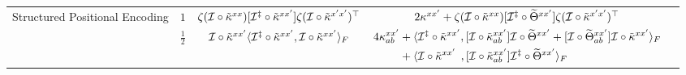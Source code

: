 \documentclass{article}
\begin{document}
\begin{table}[t]
\begin{center}
\begin{sc}
\begin{tabular}{lcccc}
    \midrule
    
    \multirow{2}{*}{
    \begin{minipage}[t]{0.2\columnwidth}%
    Structured Positional Encoding
    \end{minipage}
    } 
    &
    $1$
    &
    $
    \zeta (
        \mathcal{I} \circ
        \tilde{\kappa}^{xx}
    )
    [
        \mathcal{I}^\ddag \circ
        \tilde{\kappa}^{xx'}
    ]
    \zeta (
        \mathcal{I} \circ
        \tilde{\kappa}^{x'x'}
    )^\top
    $
    &
    $
    2 
    \kappa^{xx'}
    +
    \zeta (
        \mathcal{I} \circ
        \tilde{\kappa}^{xx}
    )
    [
        \mathcal{I}^\ddag \circ
        \widetilde{\Theta}^{xx'}
    ]
    \zeta (
        \mathcal{I} \circ
        \tilde{\kappa}^{x'x'}
    )^\top
    $
    \\
    
    &
    $\frac{1}{2}$
    &
    $
    \mathcal{I} \circ
    \tilde{\kappa}^{xx'}
    \langle
        \mathcal{I}^\ddag \circ
        \tilde{\kappa}^{xx'}
        ,
        \mathcal{I} \circ \tilde{\kappa}^{xx'}
    \rangle_F
    $
    &
    $
    \begin{aligned}
    4 \kappa_{ab}^{xx'}
    &+
    \langle
        \mathcal{I}^\ddag \circ
        \tilde{\kappa}^{xx'}
        ,
        [
            \mathcal{I} \circ
            \tilde{\kappa}_{ab}^{xx'}
        ]
        \mathcal{I} \circ
        \widetilde{\Theta}^{xx'}
        +
        [
            \mathcal{I} \circ
            \widetilde{\Theta}_{ab}^{xx'}
        ]
        \mathcal{I} \circ
        \tilde{\kappa}^{xx'}
    \rangle_F
    \\
    &+
    \langle
        \mathcal{I} \circ
        \tilde{\kappa}^{xx'}
        \phantom{\ddag}
        ,
        [
            \mathcal{I} \circ
            \tilde{\kappa}_{ab}^{xx'}   
        ]
        \mathcal{I}^\ddag \circ
        \widetilde{\Theta}^{xx'}
    \rangle_F
    \end{aligned}
    $
    \\
    
    \midrule
    

\end{tabular}
\end{sc}
\end{center}
\end{table}
\end{document}
